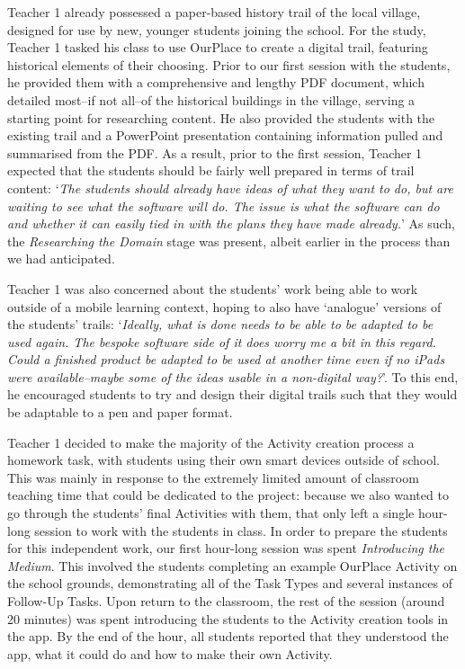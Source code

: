 \documentclass[,hyphens]{sigchi}
\begin{document}
Teacher 1 already possessed a paper-based history trail of the local village, designed for use by new, younger students joining the school. For the study, Teacher 1 tasked his class to use OurPlace to create a digital trail, featuring historical elements of their choosing. Prior to our first session with the students, he provided them with a comprehensive and lengthy PDF document, which detailed most--if not all--of the historical buildings in the village, serving a starting point for researching content. He also provided the students with the existing trail and a PowerPoint presentation containing information pulled and summarised from the PDF. As a result, prior to the first session, Teacher 1 expected that the students should be fairly well prepared in terms of trail content: `\textit{The students should already have ideas of what they want to do, but are waiting to see what the software will do. The issue is what the software can do and whether it can easily tied in with the plans they have made already.}'  As such, the \textit{Researching the Domain} stage was present, albeit earlier in the process than we had anticipated. 

Teacher 1 was also concerned about the students' work being able to work outside of a mobile learning context, hoping to also have `analogue' versions of the students' trails: `\textit{Ideally, what is done needs to be able to be adapted to be used again. The bespoke software side of it does worry me a bit in this regard. Could a finished product be adapted to be used at another time even if no iPads were available--maybe some of the ideas usable in a non-digital way?}'. To this end, he encouraged students to try and design their digital trails such that they would be adaptable to a pen and paper format.

Teacher 1 decided to make the majority of the Activity creation process a homework task, with students using their own smart devices outside of school. This was mainly in response to the extremely limited amount of classroom teaching time that could be dedicated to the project: because we also wanted to go through the students' final Activities with them, that only left a single hour-long session to work with the students in class. In order to prepare the students for this independent work, our first hour-long session was spent \textit{Introducing the Medium}. This involved the students completing an example OurPlace Activity on the school grounds, demonstrating all of the Task Types and several instances of Follow-Up Tasks. Upon return to the classroom, the rest of the session (around 20 minutes) was spent introducing the students to the Activity creation tools in the app. By the end of the hour, all students reported that they understood the app, what it could do and how to make their own Activity.
\end{document}
